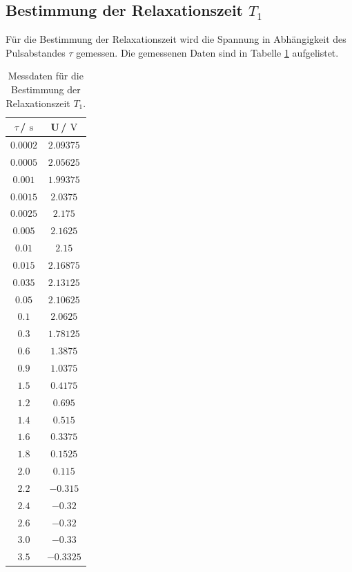 \subsection{Bestimmung der Relaxationszeit $T_{\text{1}}$}
Für die Bestimmung der Relaxationszeit wird die Spannung in Abhängigkeit des Pulsabstandes $\tau$ gemessen.
Die gemessenen Daten sind in Tabelle \ref{tab:T1_Data} aufgelistet.
\begin{table}
  \centering
  \caption{Messdaten für die Bestimmung der Relaxationszeit $T_{\text{1}}$.}
  \label{tab:T1_Data}
  \begin{tabular}{c c}
    \toprule
    $\tau$\,/\,$\SI{}{\second}$&U\,/\,$\SI{}{\volt}$\\
    \midrule
    $\num{0.0002}$&$\num{2.09375}$\\
    $\num{0.0005}$&$\num{2.05625}$\\
    $\num{0.001}$ &$\num{1.99375}$\\
    $\num{0.0015}$&$\num{2.0375}$\\
    $\num{0.0025}$&$\num{2.175}$\\
    $\num{0.005}$ &$\num{2.1625}$\\
    $\num{0.01}$  &$\num{2.15}$\\
    $\num{0.015}$ &$\num{2.16875}$\\
    $\num{0.035}$ &$\num{2.13125}$\\
    $\num{0.05}$  &$\num{2.10625}$\\
    $\num{0.1}$   &$\num{2.0625}$\\
    $\num{0.3}$   &$\num{1.78125}$\\
    $\num{0.6}$   &$\num{1.3875}$\\
    $\num{0.9}$   &$\num{1.0375}$\\
    $\num{1.5}$   &$\num{0.4175}$\\
    $\num{1.2}$   &$\num{0.695}$\\
    $\num{1.4}$   &$\num{0.515}$\\
    $\num{1.6}$   &$\num{0.3375}$\\
    $\num{1.8}$   &$\num{0.1525}$\\
    $\num{2.0}$   &$\num{0.115}$\\
    $\num{2.2}$   &$\num{-0.315}$\\
    $\num{2.4}$   &$\num{-0.32}$\\
    $\num{2.6}$   &$\num{-0.32}$\\
    $\num{3.0}$   &$\num{-0.33}$\\
    $\num{3.5}$   &$\num{-0.3325}$\\
    \bottomrule
  \end{tabular}
\end{table}
